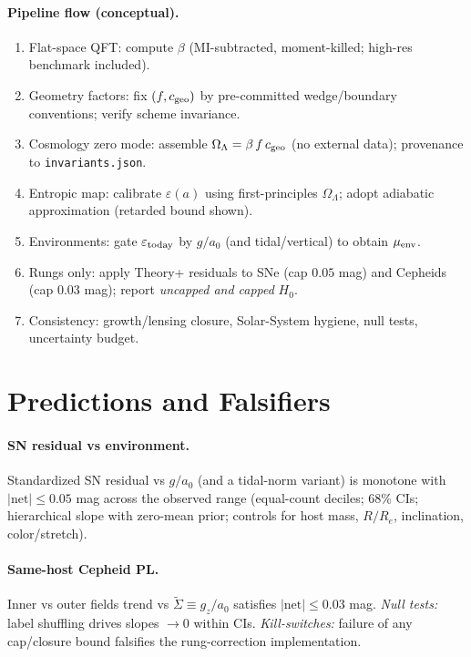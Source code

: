 \documentclass[aps,prd,onecolumn,notitlepage,superscriptaddress,nofootinbib]{revtex4-2}
\newcommand{\OL}{\Omega_{\Lambda}}
\newcommand{\Hzero}{H_0}
\newcommand{\eps}{\varepsilon}
\begin{document}
\paragraph*{Pipeline flow (conceptual).}
\begin{enumerate}[label=\Roman*.]
  \item Flat-space QFT: compute \(\beta\) (MI-subtracted, moment-killed; high-res benchmark included).
  \item Geometry factors: fix \((f,c_{\rm geo})\) by pre-committed wedge/boundary conventions; verify scheme invariance.
  \item Cosmology zero mode: assemble \(\OL=\beta\,f\,c_{\rm geo}\) (no external data); provenance to \texttt{invariants.json}.
  \item Entropic map: calibrate \(\eps(a)\) using first-principles \(\OL\); adopt adiabatic approximation (retarded bound shown).
  \item Environments: gate \(\eps_{\rm today}\) by \(g/a_0\) (and tidal/vertical) to obtain \(\mu_{\rm env}\).
  \item Rungs only: apply Theory+ residuals to SNe (cap \(0.05\) mag) and Cepheids (cap \(0.03\) mag); report \emph{uncapped and capped} \(\Hzero\).
  \item Consistency: growth/lensing closure, Solar-System hygiene, null tests, uncertainty budget.
\end{enumerate}

\section{Predictions and Falsifiers}
\paragraph*{SN residual vs environment.} Standardized SN residual vs \(g/a_0\) (and a tidal-norm variant) is monotone with \(|\mathrm{net}|\le 0.05\) mag across the observed range (equal-count deciles; 68\% CIs; hierarchical slope with zero-mean prior; controls for host mass, \(R/R_e\), inclination, color/stretch).

\paragraph*{Same-host Cepheid PL.} Inner vs outer fields trend vs \(\tilde{\Sigma}\equiv g_z/a_0\) satisfies \(|\mathrm{net}|\le 0.03\) mag. \emph{Null tests:} label shuffling drives slopes \(\to 0\) within CIs. \emph{Kill-switches:} failure of any cap/closure bound falsifies the rung-correction implementation.
\end{document}
